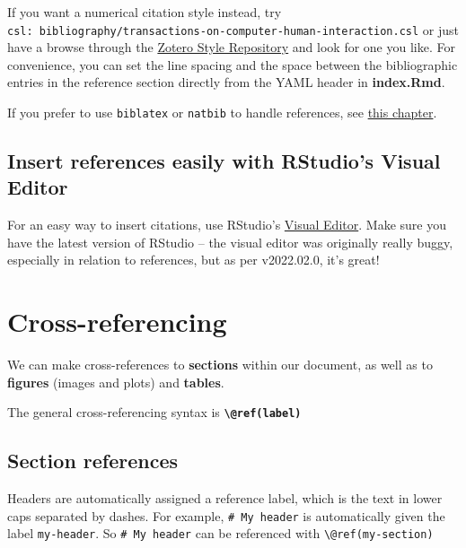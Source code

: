 \documentclass[a4paper, nobind]{templates/ociamthesis}
\begin{document}
If you want a numerical citation style instead, try \texttt{csl:\ bibliography/transactions-on-computer-human-interaction.csl} or just have a browse through the \href{https://www.zotero.org/styles}{Zotero Style Repository} and look for one you like.
For convenience, you can set the line spacing and the space between the bibliographic entries in the reference section directly from the YAML header in \textbf{index.Rmd}.

If you prefer to use \texttt{biblatex} or \texttt{natbib} to handle references, see \protect\hyperlink{customising-citations}{this chapter}.

\clearpage

\hypertarget{insert-references-easily-with-rstudios-visual-editor}{%
\subsection{Insert references easily with RStudio's Visual Editor}\label{insert-references-easily-with-rstudios-visual-editor}}

For an easy way to insert citations, use RStudio's \href{https://rstudio.github.io/visual-markdown-editing/citations.html}{Visual Editor}.
Make sure you have the latest version of RStudio -- the visual editor was originally really buggy, especially in relation to references, but as per v2022.02.0, it's great!

\hypertarget{cross-referencing}{%
\section{Cross-referencing}\label{cross-referencing}}

We can make cross-references to \textbf{sections} within our document, as well as to \textbf{figures} (images and plots) and \textbf{tables}.

The general cross-referencing syntax is \textbf{\texttt{\textbackslash{}@ref(label)}}

\hypertarget{section-references}{%
\subsection{Section references}\label{section-references}}

Headers are automatically assigned a reference label, which is the text in lower caps separated by dashes. For example, \texttt{\#\ My\ header} is automatically given the label \texttt{my-header}. So \texttt{\#\ My\ header} can be referenced with \texttt{\textbackslash{}@ref(my-section)}
\end{document}
